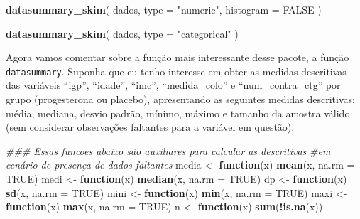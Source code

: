\documentclass[
]{book}
\newenvironment{Shaded}{\begin{snugshade}}{\end{snugshade}}
\newcommand{\CommentTok}[1]{\textcolor[rgb]{0.56,0.35,0.01}{\textit{#1}}}
\newcommand{\ControlFlowTok}[1]{\textcolor[rgb]{0.13,0.29,0.53}{\textbf{#1}}}
\newcommand{\DataTypeTok}[1]{\textcolor[rgb]{0.13,0.29,0.53}{#1}}
\newcommand{\KeywordTok}[1]{\textcolor[rgb]{0.13,0.29,0.53}{\textbf{#1}}}
\newcommand{\NormalTok}[1]{#1}
\newcommand{\OperatorTok}[1]{\textcolor[rgb]{0.81,0.36,0.00}{\textbf{#1}}}
\newcommand{\OtherTok}[1]{\textcolor[rgb]{0.56,0.35,0.01}{#1}}
\newcommand{\StringTok}[1]{\textcolor[rgb]{0.31,0.60,0.02}{#1}}
\begin{document}
\begin{Shaded}
\begin{Highlighting}[]
\KeywordTok{datasummary_skim}\NormalTok{(}
\NormalTok{  dados,}
  \DataTypeTok{type =} \StringTok{"numeric"}\NormalTok{,}
  \DataTypeTok{histogram =} \OtherTok{FALSE}
\NormalTok{)}
\end{Highlighting}
\end{Shaded}

\begin{Shaded}
\begin{Highlighting}[]
\KeywordTok{datasummary_skim}\NormalTok{(}
\NormalTok{  dados,}
  \DataTypeTok{type =} \StringTok{"categorical"}
\NormalTok{)}
\end{Highlighting}
\end{Shaded}

Agora vamos comentar sobre a função mais interessante desse pacote, a função \texttt{datasummary}. Suponha que eu tenho interesse em obter as medidas descritivas das variáveis ``igp'', ``idade'', ``imc'', ``medida\_colo'' e ``num\_contra\_ctg'' por grupo (progesterona ou placebo), apresentando as seguintes medidas descritivas: média, mediana, desvio padrão, mínimo, máximo e tamanho da amostra válido (sem considerar observações faltantes para a variável em questão).

\begin{Shaded}
\begin{Highlighting}[]
\CommentTok{### Essas funcoes abaixo são auxiliares para calcular as descritivas}
\CommentTok{#em cenário de presença de dados faltantes}
\NormalTok{media <-}\StringTok{ }\ControlFlowTok{function}\NormalTok{(x) }\KeywordTok{mean}\NormalTok{(x, }\DataTypeTok{na.rm =} \OtherTok{TRUE}\NormalTok{)}
\NormalTok{medi <-}\StringTok{ }\ControlFlowTok{function}\NormalTok{(x) }\KeywordTok{median}\NormalTok{(x, }\DataTypeTok{na.rm =} \OtherTok{TRUE}\NormalTok{)}
\NormalTok{dp <-}\StringTok{ }\ControlFlowTok{function}\NormalTok{(x) }\KeywordTok{sd}\NormalTok{(x, }\DataTypeTok{na.rm =} \OtherTok{TRUE}\NormalTok{)}
\NormalTok{mini <-}\StringTok{ }\ControlFlowTok{function}\NormalTok{(x) }\KeywordTok{min}\NormalTok{(x, }\DataTypeTok{na.rm =} \OtherTok{TRUE}\NormalTok{)}
\NormalTok{maxi <-}\StringTok{ }\ControlFlowTok{function}\NormalTok{(x) }\KeywordTok{max}\NormalTok{(x, }\DataTypeTok{na.rm =} \OtherTok{TRUE}\NormalTok{)}
\NormalTok{n <-}\StringTok{ }\ControlFlowTok{function}\NormalTok{(x) }\KeywordTok{sum}\NormalTok{(}\OperatorTok{!}\KeywordTok{is.na}\NormalTok{(x))}
\end{Highlighting}
\end{Shaded}
\end{document}
